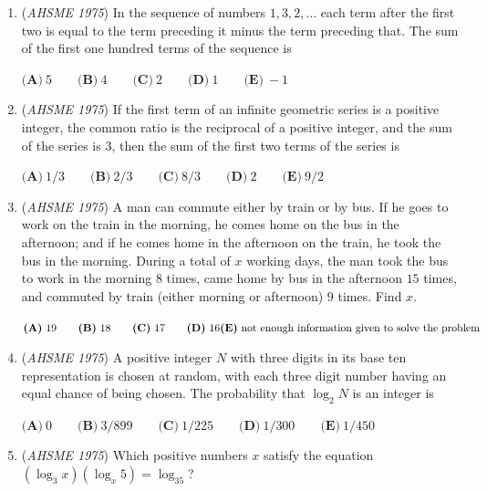 \begin{enumerate}
 $\textbf{(A)}\ whosis \cdot is \cdot so \qquad  \textbf{(B)}\ whosis \qquad  \textbf{(C)}\ is \qquad  \textbf{(D)}\ so\qquad \textbf{(E)}\ so\text{ and }so$


	\item (\textit{AHSME 1975}) In the sequence of numbers $1, 3, 2, \ldots$ each term after the first two is equal to the term preceding it minus the term preceding that. 
The sum of the first one hundred terms of the sequence is 


 $\textbf{(A)}\ 5 \qquad  \textbf{(B)}\ 4 \qquad  \textbf{(C)}\ 2 \qquad  \textbf{(D)}\ 1 \qquad  \textbf{(E)}\ -1$


	\item (\textit{AHSME 1975}) If the first term of an infinite geometric series is a positive integer, the common ratio is the reciprocal of a positive integer, 
and the sum of the series is $3$, then the sum of the first two terms of the series is 


 $\textbf{(A)}\ 1/3 \qquad  \textbf{(B)}\ 2/3 \qquad  \textbf{(C)}\ 8/3 \qquad  \textbf{(D)}\ 2 \qquad  \textbf{(E)}\ 9/2$


	\item (\textit{AHSME 1975}) A man can commute either by train or by bus. If he goes to work on the train in the morning, 
he comes home on the bus in the afternoon; and if he comes home in the afternoon on the train, 
he took the bus in the morning. During a total of $x$ working days, the man took the bus to work 
in the morning $8$ times, came home by bus in the afternoon $15$ times, and commuted by train 
(either morning or afternoon) $9$ times. Find $x$. 


 $\textbf{(A)}\ 19 \qquad  \textbf{(B)}\ 18 \qquad  \textbf{(C)}\ 17 \qquad  \textbf{(D)}\ 16 \qquad \\ \textbf{(E)}\ \text{not enough information given to solve the problem}$


	\item (\textit{AHSME 1975}) A positive integer $N$ with three digits in its base ten representation is chosen at random, 
with each three digit number having an equal chance of being chosen. The probability that $\log_2 N$ is an integer is 


 $\textbf{(A)}\ 0 \qquad  \textbf{(B)}\ 3/899 \qquad  \textbf{(C)}\ 1/225 \qquad  \textbf{(D)}\ 1/300 \qquad  \textbf{(E)}\ 1/450$


	\item (\textit{AHSME 1975}) Which positive numbers $x$ satisfy the equation $(\log_3x)(\log_x5)=\log_35$? 



\end{enumerate}
